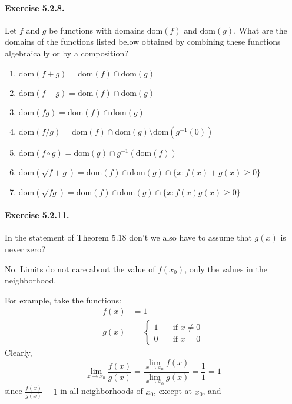 \documentclass[11pt]{article}
\newcommand{\set}[1]{\{#1\}}
\def \limitToXZero {\lim_{x \to x_0}}
\begin{document}
\newcommand{\dom}[1]{\text{dom}(#1)}
\newcommand{\inv}[1]{#1^{-1}}
\paragraph{Exercise 5.2.8.} Let $f$ and $g$ be functions with domains $\dom{f}$ and $\dom{g}$.
What are the domains of the functions listed below obtained by combining these functions algebraically or by a composition?
\begin{enumerate}[label=(\alph*)] %
  \item $ \dom{f + g} = \dom{f} \cap \dom{g} $

  \item $ \dom{f - g} = \dom{f} \cap \dom{g} $

  \item $ \dom{fg} = \dom{f} \cap \dom{g} $

  \item $ \dom{f/g} = \dom{f} \cap \dom{g} \setminus \dom{\inv{g}(0)}$
  
  \item $ \dom{f \circ g} = \dom{g} \cap \inv{g}(\dom{f})$
  
  \item $ \dom{\sqrt{f + g}} = \dom{f} \cap \dom{g} \cap \set{x : f(x) + g(x) \ge 0} $
  
  \item $ \dom{\sqrt{fg}} = \dom{f} \cap \dom{g} \cap \set{x : f(x)g(x) \ge 0} $
  
\end{enumerate}

\paragraph{Exercise 5.2.11.} In the statement of Theorem 5.18 don't we also have to assume that $g(x)$ is never zero?

No. Limits do not care about the value of $ f(x_0) $, only the values in the neighborhood.

For example, take the functions:
\begin{align*}
	f(x) &= 1 \\
	g(x) &=
		\begin{cases}
		1 & \quad \text{if } x \ne 0 \\
		0 & \quad \text{if } x = 0
		\end{cases}
\end{align*}
Clearly, 
	$$\limitToXZero \frac{f(x)}{g(x)} = \frac{\limitToXZero f(x)}{\limitToXZero g(x)} = \frac{1}{1} = 1 $$
since $ \frac{f(x)}{g(x)} =1 $ in all neighborhoods of $ x_0 $, except at $x_0$, and 
\end{document}
